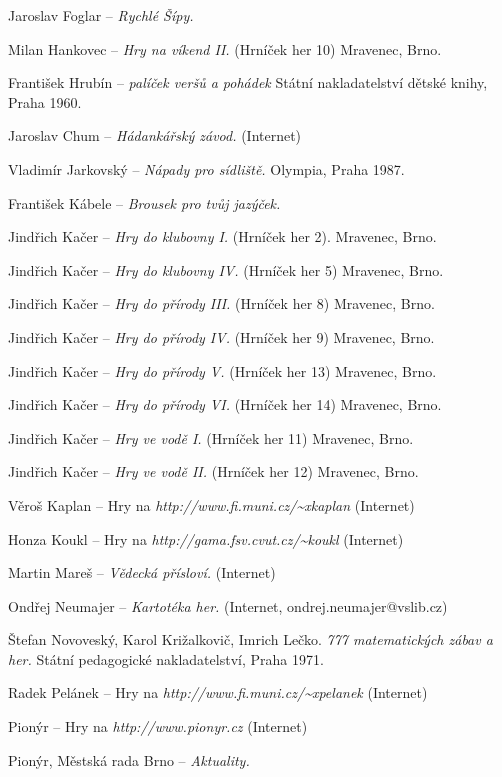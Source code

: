 \begin{multicols}{2}
\begin{list}{[]}{}
\item Jaroslav Foglar -- {\it Rychlé Šípy.}
\item Milan Hankovec -- {\it Hry na víkend II.} (Hrníček her 10)
  Mravenec, Brno.
\item František Hrubín -- {\it palíček veršů a pohádek}
  Státní nakladatelství dětské knihy, Praha 1960.
\item Jaroslav Chum -- {\it Hádankářský závod.}
  (Internet)
\item Vladimír Jarkovský -- {\it Nápady pro sídliště.}
  Olympia, Praha 1987.
\item František Kábele -- {\it Brousek pro tvůj jazýček.}
\item Jindřich Kačer -- {\it Hry do klubovny I.} (Hrníček her 2).
  Mravenec, Brno.
\item Jindřich Kačer -- {\it Hry do klubovny IV.} (Hrníček her 5)
  Mravenec, Brno.
\item Jindřich Kačer -- {\it Hry do přírody III.} (Hrníček her 8)
  Mravenec, Brno.
\item Jindřich Kačer -- {\it Hry do přírody IV.} (Hrníček her 9)
  Mravenec, Brno.
\item Jindřich Kačer -- {\it Hry do přírody V.} (Hrníček her 13)
  Mravenec, Brno.
\item Jindřich Kačer -- {\it Hry do přírody VI.} (Hrníček her 14)
  Mravenec, Brno.
\item Jindřich Kačer -- {\it Hry ve vodě I.} (Hrníček her 11)
  Mravenec, Brno.
\item Jindřich Kačer -- {\it Hry ve vodě II.} (Hrníček her 12)
  Mravenec, Brno.
\item Věroš Kaplan -- Hry na {\it http://www.fi.muni.cz/{\textasciitilde}xkaplan}
  (Internet)
\item Honza Koukl -- Hry na {\it http://gama.fsv.cvut.cz/{\textasciitilde}koukl}
  (Internet)
\item Martin Mareš -- {\it Vědecká přísloví.}
  (Internet)
\item Ondřej Neumajer -- {\it Kartotéka her.}
  (Internet, ondrej.neumajer@vslib.cz)
\item Štefan Novoveský, Karol Križalkovič, Imrich Lečko.
  {\it 777 matematických zábav a her.} Státní pedagogické nakladatelství,
  Praha 1971.
\item Radek Pelánek -- Hry na {\it http://www.fi.muni.cz/{\textasciitilde}xpelanek}
  (Internet)
\item Pionýr -- Hry na {\it http://www.pionyr.cz}
  (Internet)
\item Pionýr, Městská rada Brno -- {\it Aktuality.}

\end{list}
\end{multicols}
